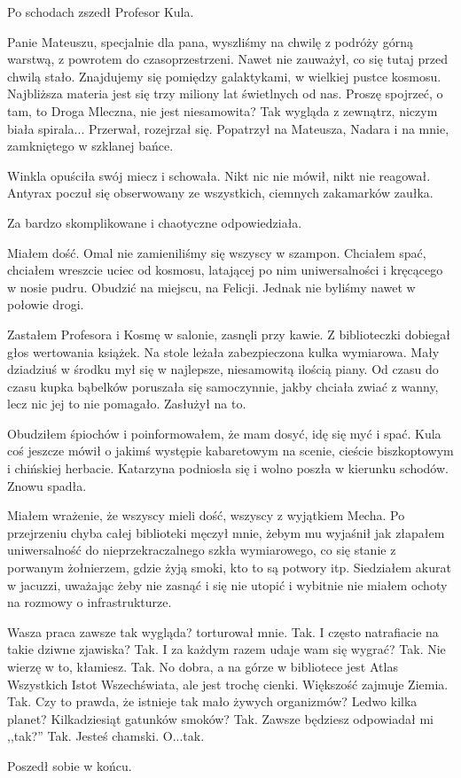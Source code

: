Po schodach zszedł Profesor Kula.
\begin{dialogue}
\ds{} Panie Mateuszu, specjalnie dla pana, wyszliśmy na chwilę z podróży górną warstwą, z powrotem do czasoprzestrzeni. \dm{} Nawet nie zauważył, co się tutaj przed chwilą stało.
\dm{} Znajdujemy się pomiędzy galaktykami,  w wielkiej pustce kosmosu. Najbliższa materia jest się trzy miliony lat świetlnych od nas. Proszę spojrzeć, 
o tam, to Droga Mleczna, nie jest niesamowita? Tak wygląda z zewnątrz, niczym biała spirala... \dm{} Przerwał, rozejrzał się. Popatrzył na Mateusza, Nadara i na mnie, zamkniętego w szklanej bańce.
\end{dialogue}

\divider{}

Winkla opuściła swój miecz i schowała. 
Nikt nic nie mówił, nikt nie reagował. 
Antyrax poczuł się obserwowany ze wszystkich, ciemnych zakamarków zaułka.
\begin{dialogue}
\ds{} Za bardzo skomplikowane i chaotyczne \dm{} odpowiedziała.
\end{dialogue}

\divider{}

Miałem dość. Omal nie zamieniliśmy się wszyscy w szampon.
Chciałem spać, chciałem wreszcie uciec od kosmosu, latającej po nim uniwersalności i kręcącego w nosie pudru.
Obudzić na miejscu, na Felicji.
Jednak nie byliśmy nawet w połowie drogi.

Zastałem Profesora i Kosmę w salonie, zasnęli przy kawie.
Z biblioteczki dobiegał głos wertowania książek.
Na stole leżała zabezpieczona kulka wymiarowa. Mały dziadziuś w środku mył się w najlepsze, niesamowitą ilością piany.
Od czasu do czasu kupka bąbelków poruszała się samoczynnie, jakby chciała zwiać z wanny, lecz nic jej to nie pomagało.
Zasłużył na to.

Obudziłem śpiochów i poinformowałem, że mam dosyć, idę się myć i spać.
Kula coś jeszcze mówił o jakimś występie kabaretowym na scenie, cieście biszkoptowym i chińskiej herbacie. 
Katarzyna podniosła się i wolno poszła w kierunku schodów.
Znowu spadła.

Miałem wrażenie, że wszyscy mieli dość, wszyscy z wyjątkiem Mecha.
Po przejrzeniu chyba całej biblioteki męczył mnie, żebym mu wyjaśnił jak złapałem uniwersalność do nieprzekraczalnego szkła wymiarowego,
co się stanie z porwanym żołnierzem, gdzie żyją smoki, kto to są potwory itp.
Siedziałem akurat w jacuzzi, uważając żeby nie zasnąć i się nie utopić i wybitnie nie miałem ochoty na rozmowy o infrastrukturze.
\begin{dialogue}
\ds{} Wasza praca zawsze tak wygląda? \dm{} torturował mnie.
\ds{} Tak.
\ds{} I często natrafiacie na takie dziwne zjawiska?
\ds{} Tak.
\ds{} I za każdym razem udaje wam się wygrać?
\ds{} Tak.
\ds{} Nie wierzę w to, kłamiesz.
\ds{} Tak.
\ds{} No dobra, a na górze w bibliotece jest Atlas Wszystkich Istot Wszechświata, ale jest trochę cienki. Większość zajmuje Ziemia.
\ds{} Tak.
\ds{} Czy to prawda, że istnieje tak mało żywych organizmów? Ledwo kilka planet? Kilkadziesiąt gatunków smoków?
\ds{} Tak.
\ds{} Zawsze będziesz odpowiadał mi ,,tak?''
\ds{} Tak.
\ds{} Jesteś chamski.
\ds{} O...tak.
\end{dialogue}
Poszedł sobie w końcu.

